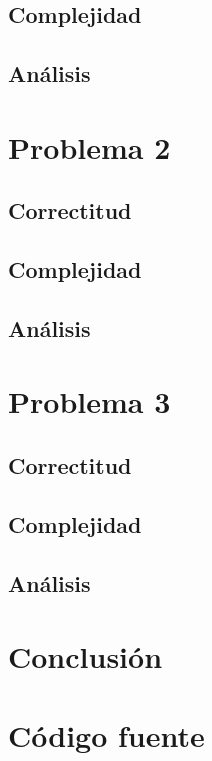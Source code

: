 \documentclass{article}
\begin{document}
\subsection{Complejidad}

\subsection{Análisis}

\section{Problema 2}

\subsection{Correctitud}

\subsection{Complejidad}

\subsection{Análisis}

\section{Problema 3}

\subsection{Correctitud}

\subsection{Complejidad}

\subsection{Análisis}

\section{Conclusión}

\section{Código fuente}
\end{document}
